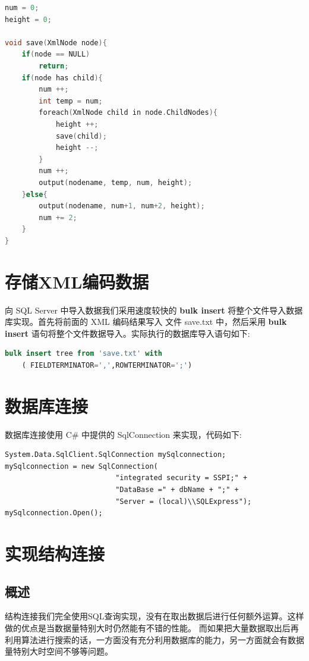 \documentclass[10pt]{article}
\begin{document}
\begin{CJK}{UTF8}{gbsn}
\begin{lstlisting}[language=C,tabsize=4]
num = 0;
height = 0;

void save(XmlNode node){
	if(node == NULL)
		return;
    if(node has child){
        num ++;
		int temp = num;
		foreach(XmlNode child in node.ChildNodes){
			height ++;
			save(child);
			height --;
		}
		num ++;
		output(nodename, temp, num, height);
	}else{
		output(nodename, num+1, num+2, height);
		num += 2;
	}
}
\end{lstlisting}

\section{存储XML编码数据}
向 SQL Server 中导入数据我们采用速度较快的 \textbf{bulk insert} 将整个文件导入数据库实现。首先将前面的 XML 编码结果写入
文件 save.txt 中，然后采用 \textbf{bulk insert} 语句将整个文件数据导入。实际执行的数据库导入语句如下:\\

\begin{lstlisting}[language=sql]
bulk insert tree from 'save.txt' with 
    ( FIELDTERMINATOR=',',ROWTERMINATOR=';')
\end{lstlisting}

\section{数据库连接}
数据库连接使用 C\# 中提供的 SqlConnection 来实现，代码如下:\\
\begin{verbatim}
System.Data.SqlClient.SqlConnection mySqlconnection;
mySqlconnection = new SqlConnection(
                          "integrated security = SSPI;" + 
                          "DataBase =" + dbName + ";" + 
                          "Server = (local)\\SQLExpress");
mySqlconnection.Open();
\end{verbatim}

\section{实现结构连接}
\subsection{概述}
结构连接我们完全使用SQL查询实现，没有在取出数据后进行任何额外运算。这样做的优点是当数据量特别大时仍然能有不错的性能。
而如果把大量数据取出后再利用算法进行搜索的话，一方面没有充分利用数据库的能力，另一方面就会有数据量特别大时空间不够等问题。


\end{CJK}
\end{document}
